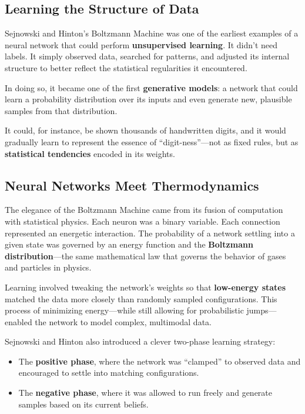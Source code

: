 \subsection*{Learning the Structure of Data}

Sejnowski and Hinton’s Boltzmann Machine was one of the earliest examples of a neural network that could perform \textbf{unsupervised learning}. It didn’t need labels. It simply observed data, searched for patterns, and adjusted its internal structure to better reflect the statistical regularities it encountered.

In doing so, it became one of the first \textbf{generative models}: a network that could learn a probability distribution over its inputs and even generate new, plausible samples from that distribution.

It could, for instance, be shown thousands of handwritten digits, and it would gradually learn to represent the essence of “digit-ness”—not as fixed rules, but as \textbf{statistical tendencies} encoded in its weights.

\subsection{Neural Networks Meet Thermodynamics}

The elegance of the Boltzmann Machine came from its fusion of computation with statistical physics. Each neuron was a binary variable. Each connection represented an energetic interaction. The probability of a network settling into a given state was governed by an energy function and the \textbf{Boltzmann distribution}—the same mathematical law that governs the behavior of gases and particles in physics.

Learning involved tweaking the network’s weights so that \textbf{low-energy states} matched the data more closely than randomly sampled configurations. This process of minimizing energy—while still allowing for probabilistic jumps—enabled the network to model complex, multimodal data.

Sejnowski and Hinton also introduced a clever two-phase learning strategy:
\begin{itemize}
  \item The \textbf{positive phase}, where the network was “clamped” to observed data and encouraged to settle into matching configurations.
  \item The \textbf{negative phase}, where it was allowed to run freely and generate samples based on its current beliefs.
\end{itemize}

